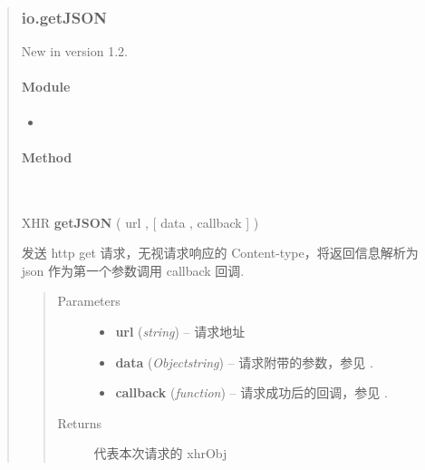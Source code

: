 \documentclass[letterpaper,10pt,english]{sphinxmanual}
\begin{document}
\begin{quote}
\subsubsection{io.getJSON}
\label{api/core/ajax/getJSON:io-getjson}\label{api/core/ajax/getJSON::doc}New in version 1.2.

\paragraph{Module}
\label{api/core/ajax/getJSON:module}\begin{itemize}
\item {}
{\hyperref[api/core/ajax/index:module-io]{}}

\end{itemize}


\paragraph{Method}
\label{api/core/ajax/getJSON:method}

\begin{fulllineitems}
\label{api/core/ajax/getJSON:io.getJSON}~
\begin{DUlineblock}{0em}
\item[] XHR \textbf{getJSON} ( url , {[} data , callback {]} )
\item[] 发送 http get 请求，无视请求响应的 Content-type，将返回信息解析为 json 作为第一个参数调用 callback 回调.
\end{DUlineblock}
\begin{quote}\begin{description}
\item[{Parameters}] \leavevmode\begin{itemize}
\item {}
\textbf{url} (\emph{string}) -- 请求地址

\item {}
\textbf{data} (\emph{Object\textbar{}string}) -- 请求附带的参数，参见 {\hyperref[api/core/ajax/io:io.cfg.data]{}} .

\item {}
\textbf{callback} (\emph{function}) -- 请求成功后的回调，参见 {\hyperref[api/core/ajax/io:io.cfg.success]{}} .

\end{itemize}

\item[{Returns}] \leavevmode
代表本次请求的 xhrObj


\end{description}
\end{quote}
\end{fulllineitems}
\end{quote}
\end{document}
